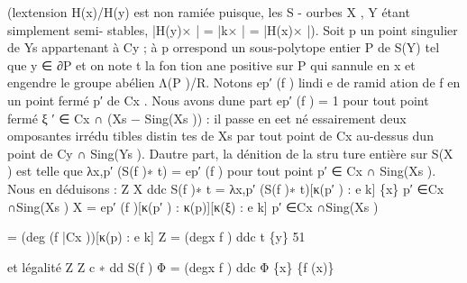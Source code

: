\documentclass[
  10pt,
]{article}
\newenvironment{Shaded}{}{}
\newcommand{\NormalTok}[1]{#1}
\begin{document}
\begin{Shaded}
\begin{Highlighting}[]
\NormalTok{(l\textquotesingle{}extension H(x)/H(y) est non ramiée puisque, les S {-} ourbes X , Y étant simplement semi{-}}
\NormalTok{stables, |H(y)× | = |k× | = |H(x)× |).}
\NormalTok{   Soit p un point singulier de Ys appartenant à Cy ; à p orrespond un sous{-}polytope entier}
\NormalTok{P de S(Y) tel que y ∈ ∂P et on note t la fon tion ane positive sur P qui s\textquotesingle{}annule en x et}
\NormalTok{engendre le groupe abélien Λ(P )/R. Notons ep′ (f ) l\textquotesingle{}indi e de ramid ation de f en un point}
\NormalTok{fermé p′ de Cx .}
\NormalTok{   Nous avons d\textquotesingle{}une part}
\NormalTok{                                          ep′ (f ) = 1}
\NormalTok{pour tout point fermé ξ ′ ∈ Cx ∩ (Xs − Sing(Xs )) : il passe en eet né essairement deux}
\NormalTok{ omposantes irrédu tibles distin tes de Xs par tout point de Cx au{-}dessus d\textquotesingle{}un point de}
\NormalTok{Cy ∩ Sing(Ys ).}
\NormalTok{  D\textquotesingle{}autre part, la dénition de la stru ture entière sur S(X ) est telle que}
\NormalTok{                                        λx,p′ (S(f )∗ t) = ep′ (f )}
\NormalTok{pour tout point p′ ∈ Cx ∩ Sing(Xs ).}
\NormalTok{  Nous en déduisons :}
\NormalTok{                Z                              X}
\NormalTok{                    ddc S(f )∗ t =                           λx,p′ (S(f )∗ t)[κ(p′ ) : e}
\NormalTok{                                                                                       k]}
\NormalTok{                    \{x\}                  p′ ∈Cx ∩Sing(Xs )}
\NormalTok{                                               X}
\NormalTok{                                    =                        ep′ (f )[κ(p′ ) : κ(p)][κ(ξ) : e}
\NormalTok{                                                                                            k]}
\NormalTok{                                         p′ ∈Cx ∩Sing(Xs )}

\NormalTok{                                    = (deg (f |Cx ))[κ(p) : e}
\NormalTok{                                                            k]}
\NormalTok{                                                Z}
\NormalTok{                                    = (degx f )      ddc t}
\NormalTok{                                                      \{y\}}
\NormalTok{                                                                                               51}



\NormalTok{et l\textquotesingle{}égalité}
\NormalTok{                            Z                               Z}
\NormalTok{                                     c      ∗}
\NormalTok{                                   dd S(f ) Φ = (degx f )                 ddc Φ}
\NormalTok{                             \{x\}                                \{f (x)\}}


\end{Highlighting}
\end{Shaded}
\end{document}
